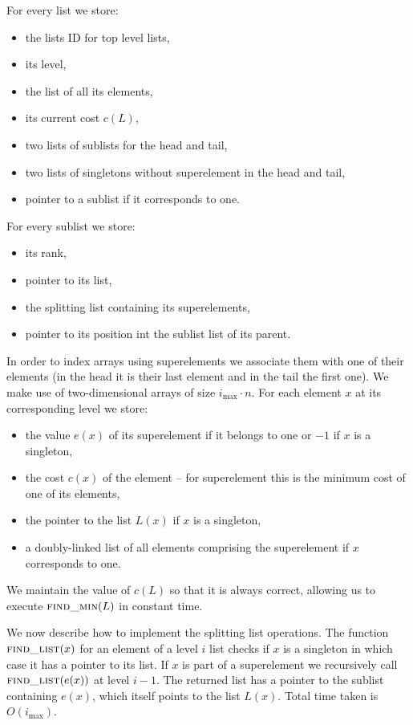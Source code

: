 For every list we store:

\begin{itemize}
    \item the lists ID for top level lists,
    \item its level,
    \item the list of all its elements,
    \item its current cost $c(L)$,
    \item two lists of sublists for the head and tail,
    \item two lists of singletons without superelement in the head and tail,
    \item pointer to a sublist if it corresponds to one.
\end{itemize}

For every sublist we store:

\begin{itemize}
    \item its rank,
    \item pointer to its list,
    \item the splitting list containing its superelements,
    \item pointer to its position int the sublist list of its parent.
\end{itemize}

In order to index arrays using superelements we associate them with one of their elements (in the head it is their last element and in the tail the first one). We make use of two-dimensional arrays of size $i_{\max} \cdot n$. For each element $x$ at its corresponding level we store:

\begin{itemize}
    \item the value $e(x)$ of its superelement if it belongs to one or $-1$ if $x$ is a singleton,
    \item the cost $c(x)$ of the element – for superelement this is the minimum cost of one of its elements,
    \item the pointer to the list $L(x)$ if $x$ is a singleton,
    \item a doubly-linked list of all elements comprising the superelement if $x$ corresponds to one.
\end{itemize}

We maintain the value of $c(L)$ so that it is always correct, allowing us to execute $\textsc{find\_min}(L)$ in constant time.

We now describe how to implement the splitting list operations. The function $\textsc{find\_list}(x)$ for an element of a level $i$ list checks if $x$ is a singleton in which case it has a pointer to its list. If $x$ is part of a superelement we recursively call $\textsc{find\_list}(e(x))$ at level $i-1$. The returned list has a pointer to the sublist containing $e(x)$, which itself points to the list $L(x)$. Total time taken is $O(i_{\max})$.

